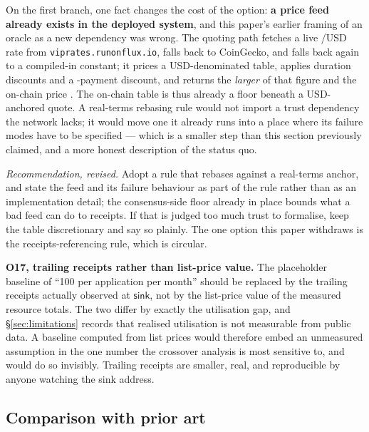 On the first branch, one fact changes the cost of the option: \textbf{a price feed already exists in
the deployed system}, and this paper's earlier framing of an oracle as a new dependency was wrong.
The quoting path fetches a live \flux/USD rate from \texttt{viprates.\allowbreak{}runonflux.\allowbreak{}io}, falls
back to CoinGecko, and falls back again to a compiled-in constant; it prices a USD-denominated table,
applies duration discounts and a \flux{}-payment discount, and returns the \emph{larger} of that
figure and the on-chain \flux{} price \shipped
{}. The
on-chain table is thus already a floor beneath a USD-anchored quote. A real-terms rebasing rule would
not import a trust dependency the network lacks; it would move one it already runs into a place where
its failure modes have to be specified --- which is a smaller step than this section previously
claimed, and a more honest description of the status quo.

\emph{Recommendation, revised.} Adopt a rule that rebases against a real-terms anchor, and state the
feed and its failure behaviour as part of the rule rather than as an implementation detail; the
consensus-side floor already in place bounds what a bad feed can do to receipts. If that is judged too
much trust to formalise, keep the table discretionary and say so plainly. The one option this paper
withdraws is the receipts-referencing rule, which is circular.

\textbf{O17, trailing receipts rather than list-price value.} The placeholder baseline of
``\num{100}\flux{} per application per month'' should be replaced by the trailing receipts actually
observed at $\mathsf{sink}$, not by the list-price value of the measured resource totals. The two
differ by exactly the utilisation gap, and \S\ref{sec:limitations} records that realised utilisation
is not measurable from public data. A baseline computed from list prices would therefore embed an
unmeasured assumption in the one number the crossover analysis is most sensitive to, and would do so
invisibly. Trailing receipts are smaller, real, and reproducible by anyone watching the sink address.

\subsection{Comparison with prior art}
\label{sec:pnr:related}

